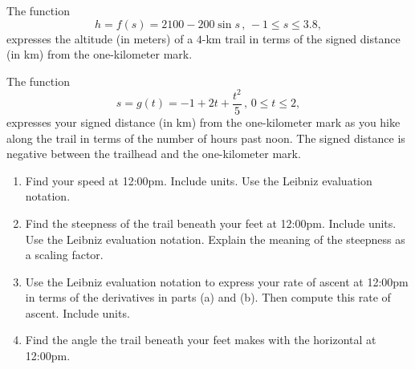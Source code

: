 \documentclass{ximera}
\begin{document}
\begin{question} \label{WQPlkfd3}
The  function
\[
      h = f(s)  = 2100 - 200 \sin s   \, , \, -1\leq s \leq 3.8 ,
\]
expresses the altitude (in meters) of a $4$-km trail in terms of the signed distance (in km) from the one-kilometer mark. 

The function
\[
    s = g(t)  =  - 1 + 2 t + \frac{t^{2}}{5} \, , \, 0\leq t \leq 2,
\]
expresses your signed distance (in km) from the one-kilometer mark as you hike along the trail in terms of the number of hours past noon. The signed distance is negative between the trailhead and the one-kilometer mark.

\begin{enumerate}
\item Find your speed at 12:00pm. Include units. Use the Leibniz evaluation notation.

\item Find the steepness of the trail beneath your feet at 12:00pm. Include units. Use the Leibniz evaluation notation. Explain the meaning of the steepness as a scaling factor.

\item Use the Leibniz evaluation notation to express your rate of ascent at 12:00pm in terms of the derivatives in parts (a) and (b). Then compute this rate of ascent. Include units.

\item Find the angle the trail beneath your feet makes with the horizontal at 12:00pm.

\end{enumerate}
\end{question}
\end{document}
